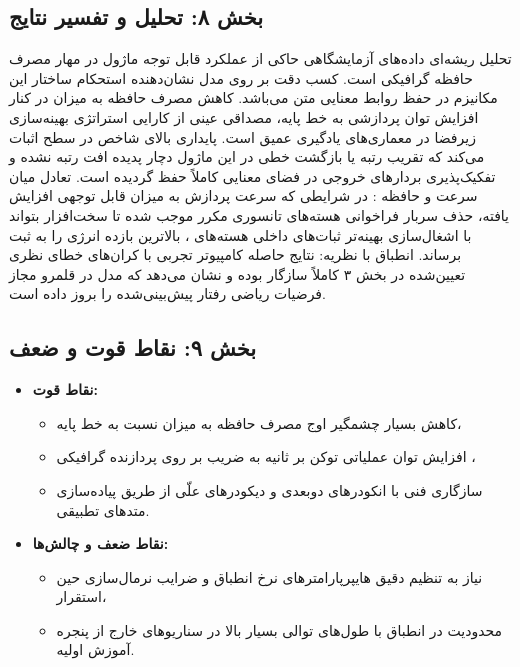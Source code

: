 \subsection*{بخش ۸: تحلیل و تفسیر نتایج }
تحلیل ریشه‌ای داده‌های آزمایشگاهی حاکی از عملکرد قابل توجه ماژول  در مهار مصرف حافظه گرافیکی است. کسب دقت  بر روی مدل  نشان‌دهنده استحکام ساختار این مکانیزم در حفظ روابط معنایی متن می‌باشد.
کاهش مصرف حافظه به میزان  در کنار افزایش توان پردازشی به  خط پایه، مصداقی عینی از کارایی استراتژی بهینه‌سازی زیرفضا در معماری‌های یادگیری عمیق است.
پایداری بالای شاخص  در سطح  اثبات می‌کند که تقریب رتبه یا بازگشت خطی در این ماژول دچار پدیده افت رتبه  نشده و تفکیک‌پذیری بردارهای خروجی در فضای معنایی کاملاً حفظ گردیده است.
تعادل میان سرعت و حافظه : در شرایطی که سرعت پردازش به میزان قابل توجهی افزایش یافته، حذف سربار فراخوانی هسته‌های تانسوری مکرر موجب شده تا سخت‌افزار بتواند با اشغال‌سازی بهینه‌تر ثبات‌های داخلی هسته‌های ، بالاترین بازده انرژی را به ثبت برساند.
انطباق با نظریه: نتایج حاصله کامپیوتر تجربی با کران‌های خطای نظری تعیین‌شده در بخش ۳ کاملاً سازگار بوده و نشان می‌دهد که مدل در قلمرو مجاز فرضیات ریاضی رفتار پیش‌بینی‌شده را بروز داده است.

\subsection*{بخش ۹: نقاط قوت و ضعف }
\begin{itemize}
    \item \textbf{نقاط قوت:}
    \begin{itemize}
        \item کاهش بسیار چشمگیر اوج مصرف حافظه به میزان  نسبت به خط پایه،
        \item افزایش توان عملیاتی توکن بر ثانیه به ضریب  بر روی پردازنده گرافیکی ،
        \item سازگاری فنی با انکودرهای دوبعدی و دیکودرهای علّی از طریق پیاده‌سازی متدهای تطبیقی.
    \end{itemize}
    \item \textbf{نقاط ضعف و چالش‌ها:}
    \begin{itemize}
        \item نیاز به تنظیم دقیق هایپرپارامترهای نرخ انطباق و ضرایب نرمال‌سازی حین استقرار،
        \item محدودیت در انطباق با طول‌های توالی بسیار بالا در سناریوهای خارج از پنجره آموزش اولیه.
    \end{itemize}
\end{itemize}

